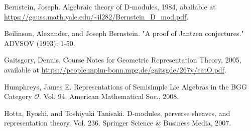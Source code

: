 	
	




\begin{thebibliography}{Yau}

	 Bernstein, Joseph. Algebraic theory of D-modules, 1984, abailable at \url{https://gauss.math.yale.edu/~il282/Bernstein_D_mod.pdf}.

	 Beilinson, Alexander, and Joseph Bernstein. "A proof of Jantzen conjectures." ADVSOV (1993): 1-50.

	 Gaitsgory, Dennis. Course Notes for Geometric Representation Theory, 2005, available at \url{https://people.mpim-bonn.mpg.de/gaitsgde/267y/catO.pdf}.

	 Humphreys, James E. Representations of Semisimple Lie Algebras in the BGG Category $\mathcal{O} $. Vol. 94. American Mathematical Soc., 2008.

	 Hotta, Ryoshi, and Toshiyuki Tanisaki. D-modules, perverse sheaves, and representation theory. Vol. 236. Springer Science \& Business Media, 2007.
\end{thebibliography}


 


